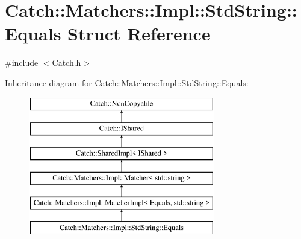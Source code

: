 \hypertarget{struct_catch_1_1_matchers_1_1_impl_1_1_std_string_1_1_equals}{}\section{Catch\+:\+:Matchers\+:\+:Impl\+:\+:Std\+String\+:\+:Equals Struct Reference}
\label{struct_catch_1_1_matchers_1_1_impl_1_1_std_string_1_1_equals}


{\ttfamily \#include $<$Catch.\+h$>$}

Inheritance diagram for Catch\+:\+:Matchers\+:\+:Impl\+:\+:Std\+String\+:\+:Equals\+:\begin{figure}[H]
\begin{center}
\leavevmode
\includegraphics[height=6.000000cm]{struct_catch_1_1_matchers_1_1_impl_1_1_std_string_1_1_equals}
\end{center}
\end{figure}
